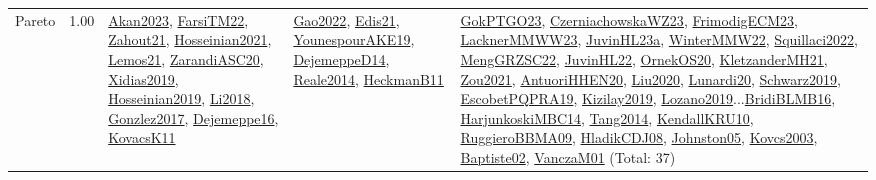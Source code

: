 {\begin{longtable}{p{3cm}r>{\raggedright\arraybackslash}p{6cm}>{\raggedright\arraybackslash}p{6cm}>{\raggedright\arraybackslash}p{8cm}}
\index{Pareto}\index{Concepts!Pareto}Pareto &  1.00 & \hyperref[detail:Akan2023]{Akan2023}, \hyperref[detail:FarsiTM22]{FarsiTM22}, \hyperref[detail:Zahout21]{Zahout21}, \hyperref[detail:Hosseinian2021]{Hosseinian2021}, \hyperref[detail:Lemos21]{Lemos21}, \hyperref[detail:ZarandiASC20]{ZarandiASC20}, \hyperref[detail:Xidias2019]{Xidias2019}, \hyperref[detail:Hosseinian2019]{Hosseinian2019}, \hyperref[detail:Li2018]{Li2018}, \hyperref[detail:Gonzlez2017]{Gonzlez2017}, \hyperref[detail:Dejemeppe16]{Dejemeppe16}, \hyperref[detail:KovacsK11]{KovacsK11} & \hyperref[detail:Gao2022]{Gao2022}, \hyperref[detail:Edis21]{Edis21}, \hyperref[detail:YounespourAKE19]{YounespourAKE19}, \hyperref[detail:DejemeppeD14]{DejemeppeD14}, \hyperref[detail:Reale2014]{Reale2014}, \hyperref[detail:HeckmanB11]{HeckmanB11} & \hyperref[detail:GokPTGO23]{GokPTGO23}, \hyperref[detail:CzerniachowskaWZ23]{CzerniachowskaWZ23}, \hyperref[detail:FrimodigECM23]{FrimodigECM23}, \hyperref[detail:LacknerMMWW23]{LacknerMMWW23}, \hyperref[detail:JuvinHL23a]{JuvinHL23a}, \hyperref[detail:WinterMMW22]{WinterMMW22}, \hyperref[detail:Squillaci2022]{Squillaci2022}, \hyperref[detail:MengGRZSC22]{MengGRZSC22}, \hyperref[detail:JuvinHL22]{JuvinHL22}, \hyperref[detail:OrnekOS20]{OrnekOS20}, \hyperref[detail:KletzanderMH21]{KletzanderMH21}, \hyperref[detail:Zou2021]{Zou2021}, \hyperref[detail:AntuoriHHEN20]{AntuoriHHEN20}, \hyperref[detail:Liu2020]{Liu2020}, \hyperref[detail:Lunardi20]{Lunardi20}, \hyperref[detail:Schwarz2019]{Schwarz2019}, \hyperref[detail:EscobetPQPRA19]{EscobetPQPRA19}, \hyperref[detail:Kizilay2019]{Kizilay2019}, \hyperref[detail:Lozano2019]{Lozano2019}...\hyperref[detail:BridiBLMB16]{BridiBLMB16}, \hyperref[detail:HarjunkoskiMBC14]{HarjunkoskiMBC14}, \hyperref[detail:Tang2014]{Tang2014}, \hyperref[detail:KendallKRU10]{KendallKRU10}, \hyperref[detail:RuggieroBBMA09]{RuggieroBBMA09}, \hyperref[detail:HladikCDJ08]{HladikCDJ08}, \hyperref[detail:Johnston05]{Johnston05}, \hyperref[detail:Kovcs2003]{Kovcs2003}, \hyperref[detail:Baptiste02]{Baptiste02}, \hyperref[detail:VanczaM01]{VanczaM01} (Total: 37)\\

\end{longtable}}
